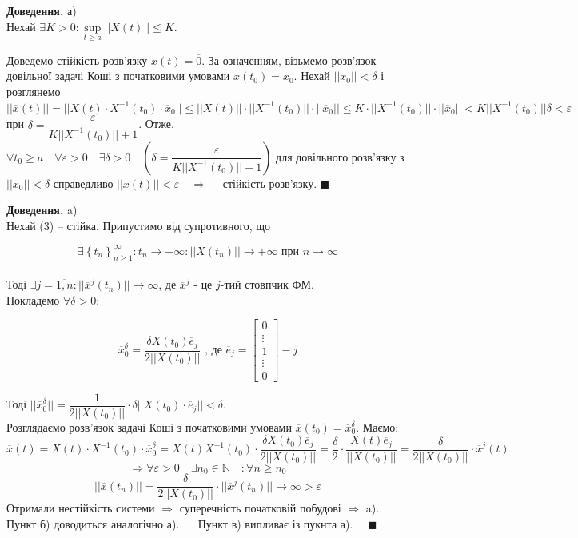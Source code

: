 \documentclass[14pt,a4paper]{scrartcl}
\theoremstyle{definition}
\theoremstyle{definition}
\theoremstyle{definition}
\begin{document}
\begin{spacing}{2.25}
\textbf{Доведення.} а) \fbox{$\Longleftarrow$} \\ Нехай $ \exists K > 0 : \sup\limits_{t\geq a} ||X(t)|| \leq K$.

 Доведемо стійкість розв'язку $\overline{x} (t) = \overline{0}.$ За означенням, візьмемо розв'язок довільної задачі Коші з початковими умовами $\overline{x } (t_0) = \overline{x}_0$.
Нехай $|| \overline{x}_0 || < \delta$ і розглянемо $ || \overline{x} (t)|| = || X(t) \cdot X^{-1} (t_0) \cdot \overline{x}_0 || \leq ||X(t)|| \cdot || X^{-1} (t_0)|| \cdot || \overline{x}_0|| \leq K \cdot || X^{-1} (t_0)|| \cdot || \overline{x}_0|| < K || X^{-1} (t_0)||\delta < \varepsilon $ при $ \delta = \dfrac{\varepsilon }{K || X^{-1} (t_0)|| + 1} $.
Отже, $\forall t_0 \geq  a \quad \forall \varepsilon >0 \quad \exists \delta > 0 \quad \left(  \delta = \dfrac{\varepsilon }{K || X^{-1} (t_0)|| + 1}  \right)$  для довільного розв'язку з $ || \overline{x}_0|| < \delta$ справедливо $ ||\overline{x} (t)|| < \varepsilon  \quad \Longrightarrow \quad $ стійкість розв'язку. $\blacksquare$  \\
\end{spacing}
\textbf{Доведення.} a) \fbox{$\Longrightarrow$} \\ Нехай (3) -- стійка. Припустимо від супротивного, що

$$\exists  \left\lbrace t_n \right\rbrace_{n\geq 1}^{\infty} : t_n \rightarrow +\infty : ||X(t_n)|| \to {+\infty} \text{ при } n \to \infty$$\\
Тоді $\exists j = \overline{1, n} : || \overline{x}^{j} (t_n)|| \to \infty$, де $\overline{x}^j$  - це $j$-тий стовпчик ФМ. \\ Покладемо $\forall \delta > 0:$


$$
\overline{x}^{\delta}_0 = \frac{\delta X(t_0) \overline{e}_j}{2 ||X(t_0)||} \text{ , де }\overline{e}_j = \begin{bmatrix}
 0\\
 \vdots\\
 1\\
 \vdots\\
 0
\end{bmatrix} - j
$$

Тоді $|| \overline{x}_0^{\delta}|| = \dfrac{1}{ 2 ||X(t_0)||}  \cdot \delta ||X(t_0) \cdot \overline{e}_j|| < \delta $.\\
Розглядаємо розв'язок задачі Коші з початковими умовами $ \overline{x} (t_0) = \overline{x} _0 ^ \delta$. Маємо:
$$
\overline{x} (t) = X(t) \cdot X^{-1}(t_0) \cdot \overline{x}_0 ^\delta = X(t) X^{-1} (t_0) \cdot \dfrac{ \delta X(t_0) \overline{e}_j}{ 2 ||X(t_0)||} = \frac{\delta}{2} \cdot \frac{X(t) \overline{e}_j}{ ||X(t_0)||} = \frac{\delta}{2 ||X(t_0)|| } \cdot \overline{x}^j (t)
$$
$$
\Longrightarrow \forall \varepsilon >0 \quad \exists n_0 \in \mathbb{N} \quad : \forall n \geq n_0
$$
$$
||\overline{x} (t_n)|| = \frac{\delta}{ 2 ||X(t_0)|| } \cdot ||\overline{x}^j (t_n)|| \to \infty > \varepsilon
$$
Отримали нестійкість системи $ \Rightarrow  $ суперечність початковій побудові $ \Rightarrow$ a).\\
Пункт б) доводиться аналогічно а). $\quad$ Пункт в) випливає із пукнта а). $\quad \blacksquare$
\end{document}

